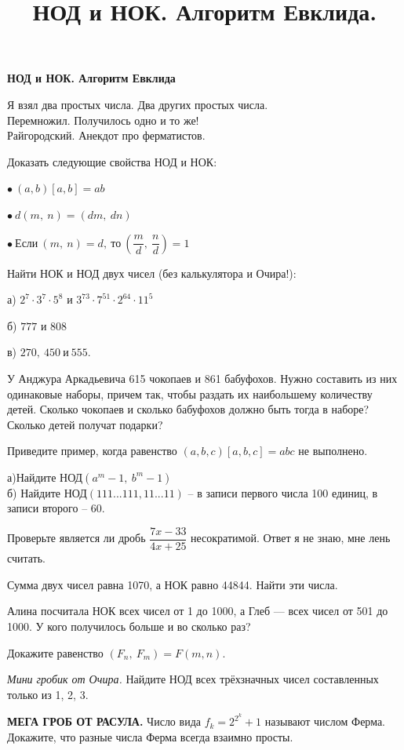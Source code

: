 \centerline{\bf \Huge НОД и НОК. Алгоритм Евклида}
\title{НОД и НОК. Алгоритм Евклида.}

\begin{flushright}
    \scriptsize Я взял два простых числа. Два других простых числа. \\Перемножил. Получилось одно и то же!\\
    Райгородский. Анекдот про ферматистов.
\end{flushright}
Доказать следующие свойства НОД и НОК:

$\bullet \ (a, b)[a, b]=ab$

$\bullet \ d(m, \ n) = (dm, \ dn)$

$\bullet \  \text{Если}\ (m, \ n) = d, \ \text{то} \ (\dfrac{m}{d}, \ \dfrac{n}{d}) = 1$

Найти НОК и НОД двух чисел (без калькулятора и Очира!):

а) $2^7\cdot3^7\cdot5^8$ и $3^{73}\cdot7^{51}\cdot2^{64}\cdot11^5$

б) $777$ и $808$

в) $270, \  450 \ \text{и} \ 555.$

 У Анджура Аркадьевича 615 чокопаев и 861 бабуфохов. Нужно составить из них одинаковые наборы,
причем так, чтобы раздать их наибольшему количеству детей. Сколько чокопаев и сколько бабуфохов должно быть тогда в наборе? Сколько детей получат подарки?

 Приведите пример, когда равенство  $(a, b, c)[a, b, c] = abc$  не выполнено. 

а)Найдите НОД$(a^m - 1, \ b^m - 1 )$\\
б) Найдите  НОД$(111...111, 11...11)$  – в записи первого числа 100 единиц, в записи второго – $60.$

Проверьте является ли дробь $\dfrac{7x-33}{4x+25}$ несократимой. Ответ я не знаю, мне лень считать.

Сумма двух чисел равна 1070, а НОК равно 44844. Найти эти числа.

 Алина посчитала НОК всех чисел от 1 до 1000, а Глеб — всех чисел от 501 до 1000. У кого получилось больше и во сколько раз?

Докажите равенство  $(F_n, \ F_m) = F(m, n)$.


\textit{Мини гробик от Очира.} Найдите НОД всех трёхзначных чисел составленных только из 1, 2, 3.

\textbf{МЕГА ГРОБ ОТ РАСУЛА.} Число вида $f_k = 2^{2^{k}} + 1 $ называют числом Ферма. Докажите, что разные числа Ферма всегда взаимно просты. 